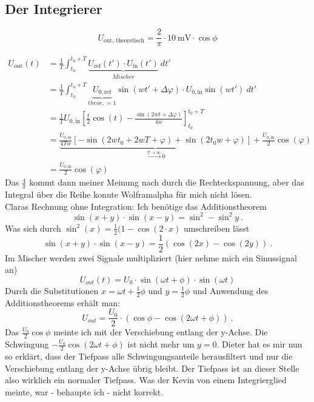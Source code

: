 \subsection{Der Integrierer}
\[U_\text{out, theoretisch} = \frac{2}{\pi}\cdot\SI{10}{\milli\volt}\cdot \cos\phi\]

\begin{align}
	U_\text{out}(t) &= \frac{1}{T}\int_{t_0}^{t_0+T}\underbrace{U_\text{ref}(t')\cdot U_\text{in}(t')}_{Mischer}\ dt' \\
	&= \frac{1}{T}\int_{t_0}^{t_0+T}\underbrace{U_{0,\text{ref}}}_{theor.\ = 1}\sin(wt'+\Delta\varphi)\cdot U_{0,\text{in}}\sin(wt')\ dt' \\
	&= \frac{1}{T}U_{0,\text{in}}\left[\frac{t}{2}\cos(t)-\frac{\sin(2wt+\Delta\varphi)}{4w}\right]_{t_0}^{t_0+T} \\
	&= \underbrace{\frac{U_{0,\text{in}}}{4Tw}\left[-\sin(2wt_0+2wT+\varphi)+\sin(2t_0w+\varphi)\right]}_{\overset{T\rightarrow\infty}{\longrightarrow} 0}+\frac{U_{0,\text{in}}}{2}\cos(\varphi) \\
	&= \frac{U_{0,\text{in}}}{2}\cos(\varphi)
\end{align}
Das $\frac{4}{\pi}$ kommt dann meiner Meinung nach durch die Rechteckspannung, aber das Integral über die Reihe konnte Wolframalpha für mich nicht lösen. \\
Claras Rechnung ohne Integration:
Ich benötige das Additionstheorem
\begin{equation}
	\sin(x+y) \cdot \sin(x-y)  = \sin^2 - \sin^2 y \ .
\end{equation}
Was sich durch $\sin^2(x) = \frac{1}{2}(1-\cos(2\cdot x)$ umschreiben lässt
\begin{equation}
\sin(x+y) \cdot \sin(x-y)  = \frac{1}{2} \left(\cos(2x)-\cos(2y) \right) \ .
\end{equation}
Im Mischer werden zwei Signale multipliziert (hier nehme mich ein Sinussignal an)
\begin{equation}
U_{out}(t)=U_0 \cdot \sin(\omega t + \phi) \cdot \sin(\omega t)
\end{equation}
Durch die Substitutionen $x= \omega t + \frac{1}{2} \phi$ und $y=\frac{1}{2} \phi$ und Anwendung des Additionstheorems erhält man:
\begin{equation}
U_{out}=\frac{U_0}{2}\cdot(\cos{\phi}-\cos{(2\omega t + \phi)}) \ .
\end{equation}
Das $\frac{U_0}{2}\cos \phi$ meinte ich mit der Verschiebung entlang der y-Achse. Die Schwingung $-\frac{U_0}{2}\cos{(2\omega t + \phi)}$ ist nicht mehr um $y=0$. Dieter hat es mir nun so erklärt, dass der Tiefpass alle Schwingungsanteile herausfiltert und nur die Verschiebung entlang der y-Achse übrig bleibt. Der Tiefpass ist an dieser Stelle also wirklich ein normaler Tiefpass. Was der Kevin von einem Integrierglied meinte, war - behaupte ich - nicht korrekt.
\clearpage
	
